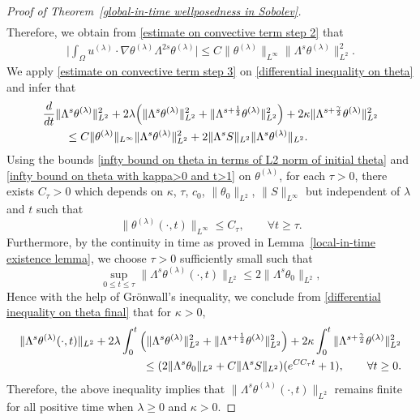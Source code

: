 \documentclass[reqno]{amsart}%
\theoremstyle{definition}
\theoremstyle{remark}
\numberwithin{equation}{section}
\newcommand{\1}{\mathbf{1}}
\numberwithin{equation}{section}
\numberwithin{theorem}{section}
\numberwithin{figure}{section}
\begin{document}
\begin{proof}[Proof of Theorem~\ref{global-in-time wellposedness in Sobolev}]
\begin{align}
\end{align}
Therefore, we obtain from \eqref{estimate on convective term step 2} that
\begin{align}\label{estimate on convective term step 3}
\Big|\int_{\Omega}u^{(\lambda)}\cdot\nabla\theta^{(\lambda)}\Lambda^{2s}\theta^{(\lambda)}\Big|\le C\|\theta^{(\lambda)}\|_{L^\infty}\|\Lambda^{s}\theta^{(\lambda)}\|^2_{L^2}.
\end{align}
We apply \eqref{estimate on convective term step 3} on \eqref{differential inequality on theta} and infer that
\begin{align}\label{differential inequality on theta final}
&\frac{d}{dt}\|\Lambda^s\theta^{(\lambda)}\|^2_{L^2}+2\lambda\Big(\|\Lambda^{s}\theta^{(\lambda)}\|^2_{L^2}+\|\Lambda^{s+\frac{1}{2}}\theta^{(\lambda)}\|^2_{L^2}\Big)+2\kappa\|\Lambda^{s+\frac{\gamma}{2}}\theta^{(\lambda)}\|^2_{L^2}\notag\\
&\qquad\le C\|\theta^{(\lambda)}\|_{L^\infty}\|\Lambda^{s}\theta^{(\lambda)}\|^2_{L^2}+2\|\Lambda^sS\|_{L^2}\|\Lambda^s\theta^{(\lambda)}\|_{L^2}.
\end{align}
Using the bounds \eqref{infty bound on theta in terms of L2 norm of initial theta} and \eqref{infty bound on theta with kappa>0 and t>1} on $\theta^{(\lambda)}$, for each $\tau>0$, there exists $C_\tau >0$ which depends on $\kappa$, $\tau$, $c_0$, $\|\theta_0\|_{L^2}$, $\|S\|_{L^\infty}$ but independent of $\lambda$ and $t$ such that
\begin{equation}\label{L infty bound on theta for t>tau}
\|\theta^{(\lambda)}(\cdot,t)\|_{L^\infty}\le C_\tau ,\qquad \forall t\ge\tau.
\end{equation}
Furthermore, by the continuity in time as proved in Lemma~\ref{local-in-time existence lemma}, we choose $\tau>0$ sufficiently small such that
\[\sup_{0\le t\le\tau}\|\Lambda^{s}\theta^{(\lambda)}(\cdot,t)\|_{L^2}\le 2\|\Lambda^{s}\theta_0\|_{L^2},\]
Hence with the help of Gr\"{o}nwall's inequality, we conclude from \eqref{differential inequality on theta final} that for $\kappa>0$,
\begin{align}\label{H^s bound for theta kappa>0 and nu>0}
\|\Lambda^{s}\theta^{(\lambda)}(\cdot,t)\|_{L^2}+2\lambda\int_{0}^{t}\Big(\|\Lambda^{s}\theta^{(\lambda)}\|^2_{L^2}+\|\Lambda^{s+\frac{1}{2}}\theta^{(\lambda)}\|^2_{L^2}\Big)+2\kappa\int_{0}^{t}\|\Lambda^{s+\frac{\gamma}{2}}\theta^{(\lambda)}\|^2_{L^2}\notag\\
\le (2\|\Lambda^{s}\theta_0\|_{L^2}+C\|\Lambda^{s}S\|_{L^2})(e^{CC_\tau t}+1),\qquad \forall t\ge0.
\end{align}
Therefore, the above inequality implies that $\|\Lambda^{s}\theta^{(\lambda)}(\cdot,t)\|_{L^2}$ remains finite for all positive time when $\lambda\ge0$ and $\kappa>0$.
\end{proof}
\end{document}
